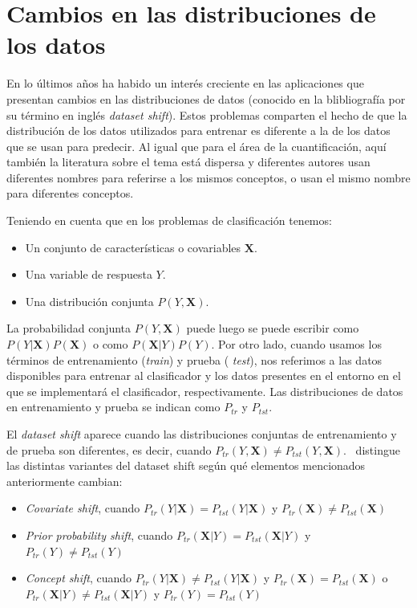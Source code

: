 \section{Cambios en las distribuciones de los datos}

En lo últimos años ha habido un interés creciente en las aplicaciones que
presentan cambios en las distribuciones de datos (conocido en la blibliografía
por su término en inglés {\it dataset shift\/}). Estos problemas comparten el
hecho de que la distribución de los datos utilizados para entrenar es diferente
a la de los datos que se usan para predecir. Al igual que para el área de la
cuantificación, aquí también la literatura sobre el tema está dispersa y
diferentes autores usan diferentes nombres para referirse a los mismos
conceptos, o usan el mismo nombre para diferentes conceptos.

Teniendo en cuenta que en los problemas de clasificación tenemos:

\begin{itemize}
    \item Un conjunto de características o covariables $\mathbf{X}$.
    \item Una variable de respuesta $Y$.
    \item Una distribución conjunta $P(Y,\mathbf{X})$.
\end{itemize}

La probabilidad conjunta $P(Y,\mathbf{X})$ puede luego se puede escribir como
$P(Y|\mathbf{X})P(\mathbf{X})$ o como $P(\mathbf{X}|Y)P(Y)$. Por otro lado,
cuando usamos los términos de entrenamiento ({\it train\/}) y prueba ({\it
test\/}), nos referimos a las datos disponibles para entrenar al clasificador y
los datos presentes en el entorno en el que se implementará el clasificador,
respectivamente. Las distribuciones de datos en entrenamiento y prueba se
indican como $P_{tr}$ y $P_{tst}$.

El {\it dataset shift\/} aparece cuando las distribuciones conjuntas de
entrenamiento y de prueba son diferentes, es decir, cuando $P_{tr}(Y,\mathbf{X})
\neq P_{tst}(Y,\mathbf{X})$.~\citet{moreno2012unifying} distingue las distintas
variantes del dataset shift según qué elementos mencionados anteriormente
cambian:

\begin{itemize}
    \item {\it Covariate shift}, cuando $P_{tr}(Y|\mathbf{X}) =
    P_{tst}(Y|\mathbf{X})$ y $P_{tr}(\mathbf{X}) \neq P_{tst}(\mathbf{X})$
    \item {\it Prior probability shift}, cuando $P_{tr}(\mathbf{X}|Y) =
    P_{tst}(\mathbf{X}|Y)$ y $P_{tr}(Y) \neq P_{tst}(Y)$
    \item {\it Concept shift}, cuando $P_{tr}(Y|\mathbf{X}) \neq
    P_{tst}(Y|\mathbf{X})$ y $P_{tr}(\mathbf{X}) = P_{tst}(\mathbf{X})$ o
    $P_{tr}(\mathbf{X}|Y) \neq P_{tst}(\mathbf{X}|Y)$ y $P_{tr}(Y) = P_{tst}(Y)$
\end{itemize}

